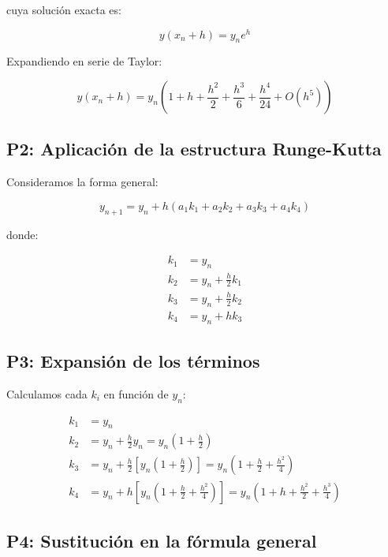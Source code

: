 \documentclass[12pt,a4paper]{article}
\begin{document}
cuya solución exacta es:

\begin{equation}
y(x_n + h) = y_n e^{h}
\end{equation}

Expandiendo en serie de Taylor:

\begin{equation}
y(x_n + h) = y_n \left(1 + h + \frac{h^2}{2} + \frac{h^3}{6} + \frac{h^4}{24} + O(h^5)\right)
\end{equation}

\subsection*{P2: Aplicación de la estructura Runge-Kutta}

Consideramos la forma general:

\begin{equation}
y_{n+1} = y_n + h(a_1 k_1 + a_2 k_2 + a_3 k_3 + a_4 k_4)
\end{equation}

donde:

\begin{align}
k_1 &= y_n \\
k_2 &= y_n + \frac{h}{2}k_1 \\
k_3 &= y_n + \frac{h}{2}k_2 \\
k_4 &= y_n + h k_3
\end{align}

\subsection*{P3: Expansión de los términos}

Calculamos cada $k_i$ en función de $y_n$:

\begin{align}
k_1 &= y_n \\
k_2 &= y_n + \frac{h}{2}y_n = y_n\left(1 + \frac{h}{2}\right) \\
k_3 &= y_n + \frac{h}{2}\left[y_n\left(1 + \frac{h}{2}\right)\right]
= y_n\left(1 + \frac{h}{2} + \frac{h^2}{4}\right) \\
k_4 &= y_n + h \left[y_n\left(1 + \frac{h}{2} + \frac{h^2}{4}\right)\right]
= y_n\left(1 + h + \frac{h^2}{2} + \frac{h^3}{4}\right)
\end{align}

\subsection*{P4: Sustitución en la fórmula general}
\end{document}
